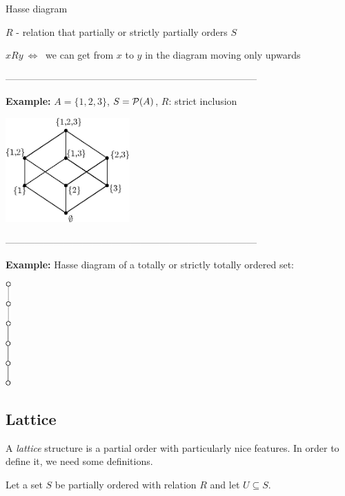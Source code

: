 \documentclass[11pt,paper=b5,footinclude,headinclude]{scrbook} %
\def\cee {{~\Leftrightarrow~}}
\theoremstyle{remark}
\theoremstyle{definition} %
\theoremstyle{theorem} %
\begin{document}
Hasse diagram

$R$ - relation that partially or strictly partially orders $S$

$xRy\cee $ we can get from $x$ to $y$ in the diagram moving only upwards

\bigskip
------------------------------------------------------------------------------

\bigskip

\textbf{ Example:} $A = \{1,2,3\}$, $S = {\cal P}(A)$, $R$: strict inclusion

\begin{center}
\includegraphics[height=40mm]{Hasse.eps}
\end{center}

\bigskip

------------------------------------------------------------------------------
\bigskip

\textbf{ Example:} Hasse diagram of a totally or strictly totally ordered set:

\begin{center}
\includegraphics[height=40mm]{Hasse1.eps}
\end{center}

\pagebreak
\subsection{Lattice}

A {\em lattice} structure is a partial order with particularly nice features.
In order to define it, we need some definitions.

\bigskip

Let a set $S$ be partially ordered with relation $R$ and let $U\subseteq S$.
\end{document}
